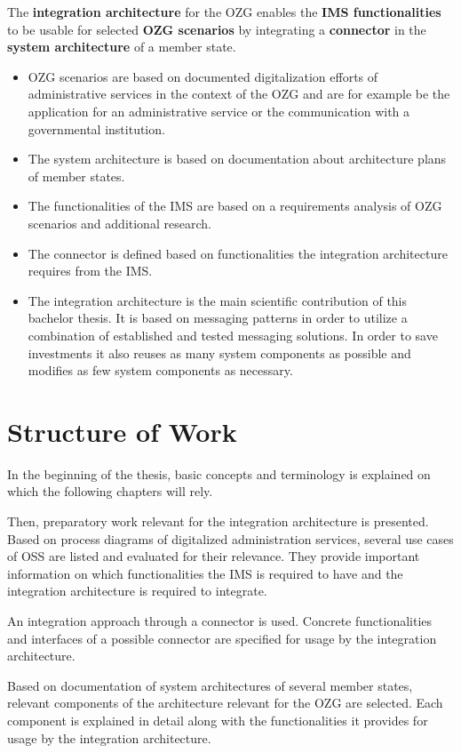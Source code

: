 \documentclass[
     12pt,         %
     a4paper,      %
     BCOR=10mm,version=first,     %
     DIV=14,version=first,        %
     ]{scrreprt}
\begin{document}
The \textbf{integration architecture} for the OZG enables the \textbf{IMS functionalities} to be usable for selected \textbf{OZG scenarios} by integrating a \textbf{connector} in the \textbf{system architecture} of a member state.

\begin{itemize}
    \item OZG scenarios are based on documented digitalization efforts of administrative services in the context of the OZG and are for example be the application for an administrative service or the communication with a governmental institution.
    \item The system architecture is based on documentation about architecture plans of member states.
    \item The functionalities of the IMS are based on a requirements analysis of OZG scenarios and additional research.
    \item The connector is defined based on functionalities the integration architecture requires from the IMS.
    \item The integration architecture is the main scientific contribution of this bachelor thesis. It is based on messaging patterns in order to utilize a combination of established and tested messaging solutions. In order to save investments it also reuses as many system components as possible and modifies as few system components as necessary.
\end{itemize}

\chapter{Structure of Work}
In the beginning of the thesis, basic concepts and terminology is explained on which the following chapters will rely.

Then, preparatory work relevant for the integration architecture is presented.
Based on process diagrams of digitalized administration services, several use cases of OSS are listed and evaluated for their relevance. They provide important information on which functionalities the IMS is required to have and the integration architecture is required to integrate.

An integration approach through a connector is used. Concrete functionalities and interfaces of a possible connector are specified for usage by the integration architecture.

Based on documentation of system architectures of several member states, relevant components of the architecture relevant for the OZG are selected. Each component is explained in detail along with the functionalities it provides for usage by the integration architecture.
\end{document}
